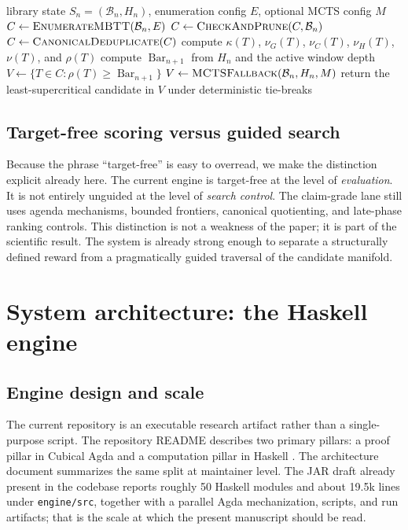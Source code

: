 \documentclass[pdflatex,sn-mathphys,Numbered]{sn-jnl}
\theoremstyle{thmstyleone}
\theoremstyle{thmstylethree}
\theoremstyle{thmstyletwo}
\newcommand{\Bcal}{\mathcal{B}}
\newcommand{\nuG}{\nu_G}
\newcommand{\nuC}{\nu_C}
\newcommand{\nuH}{\nu_H}
\DeclareMathOperator{\BarOp}{Bar}
\begin{document}
\begin{algorithm}[t]
\caption{Executable PEN selection loop}
\label{alg:pen}
\begin{algorithmic}[1]
\Require library state $S_n=(\Bcal_n,H_n)$, enumeration config $E$, optional MCTS config $M$
\State $C \gets \textsc{EnumerateMBTT}(\Bcal_n,E)$
\State $C \gets \textsc{CheckAndPrune}(C,\Bcal_n)$
\State $C \gets \textsc{CanonicalDeduplicate}(C)$
  \State compute $\kappa(T)$, $\nuG(T)$, $\nuC(T)$, $\nuH(T)$, $\nu(T)$, and $\rho(T)$
\EndFor
\State compute $\BarOp_{n+1}$ from $H_n$ and the active window depth
\State $V \gets \{T \in C : \rho(T) \geq \BarOp_{n+1}\}$
  \State $V \gets \textsc{MCTSFallback}(\Bcal_n,H_n,M)$
\EndIf
\State return the least-supercritical candidate in $V$ under deterministic tie-breaks
\end{algorithmic}
\end{algorithm}

\subsection{Target-free scoring versus guided search}

Because the phrase ``target-free'' is easy to overread, we make the distinction explicit already here. The current engine is target-free at the level of \emph{evaluation}. It is not entirely unguided at the level of \emph{search control}. The claim-grade lane still uses agenda mechanisms, bounded frontiers, canonical quotienting, and late-phase ranking controls. This distinction is not a weakness of the paper; it is part of the scientific result. The system is already strong enough to separate a structurally defined reward from a pragmatically guided traversal of the candidate manifold.

\section{System architecture: the Haskell engine}\label{sec:architecture}

\subsection{Engine design and scale}

The current repository is an executable research artifact rather than a single-purpose script. The repository README describes two primary pillars: a proof pillar in Cubical Agda and a computation pillar in Haskell \cite{pen-artifact}. The architecture document summarizes the same split at maintainer level. The JAR draft already present in the codebase reports roughly 50 Haskell modules and about 19.5k lines under \texttt{engine/src}, together with a parallel Agda mechanization, scripts, and run artifacts; that is the scale at which the present manuscript should be read.
\end{document}
